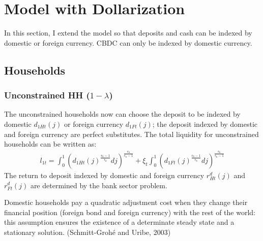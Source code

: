 \documentclass[12pt]{article}
\begin{document}
\section{Model with Dollarization}
In this section, I extend the model so that deposits and cash can be indexed by domestic or foreign currency. CBDC can only be indexed by domestic currency. 
\subsection{Households}
\subsubsection*{Unconstrained HH ($1-\lambda$)} 
The unconstrained households now can choose the deposit to be indexed by domestic $d_{1Ht}(j)$ or foreign currency $d_{1Ft}(j)$; the deposit indexed by domestic and foreign currency are perfect substitutes. The total liquidity for unconstrained households can be written as: 
\begin{align*}
l_{1t} = \int_0^1({d_{1Ht}(j)}^{\frac{\epsilon_b-1}{\epsilon_b}}dj)^{\frac{\epsilon_b}{\epsilon_b-1}}+\xi_t\int_0^1({d_{1Ft}(j)}^{\frac{\epsilon_b-1}{\epsilon_b}}dj)^{\frac{\epsilon_b}{\epsilon_b-1}} 
\end{align*}
The return to deposit indexed by domestic and foreign currency $r_{Ht}^d(j)$ and $r_{Ft}^d(j)$ are determined by the bank sector problem. 

Domestic households pay a quadratic adjustment cost when they change their financial position (foreign bond and foreign currency) with the rest of the world: this assumption ensures the existence of a determinate steady state and a stationary solution. (Schmitt-Groh{\'e} and Uribe, 2003)
\end{document}
